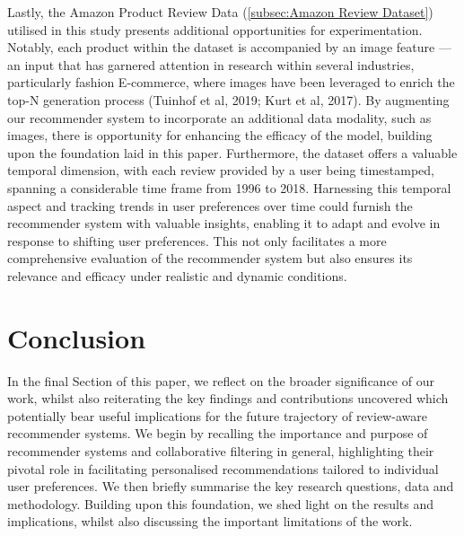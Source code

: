 Lastly, the Amazon Product Review Data (\ref{subsec:Amazon Review Dataset}) utilised in this study presents additional opportunities for experimentation. Notably, each product within the dataset is accompanied by an image feature — an input that has garnered attention in research within several industries, particularly fashion E-commerce, where images have been leveraged to enrich the top-N generation process (Tuinhof et al, 2019; Kurt et al, 2017). By augmenting our recommender system to incorporate an additional data modality, such as images, there is opportunity for enhancing the efficacy of the model, building upon the foundation laid in this paper. Furthermore, the dataset offers a valuable temporal dimension, with each review provided by a user being timestamped, spanning a considerable time frame from 1996 to 2018. Harnessing this temporal aspect and tracking trends in user preferences over time could furnish the recommender system with valuable insights, enabling it to adapt and evolve in response to shifting user preferences. This not only facilitates a more comprehensive evaluation of the recommender system but also ensures its relevance and efficacy under realistic and dynamic conditions. 

\section{Conclusion}
\label{sec:Conclusion for Conclusion}

In the final Section of this paper, we reflect on the broader significance of our work, whilst also reiterating the key findings and contributions uncovered which potentially bear useful implications for the future trajectory of review-aware recommender systems. We begin by recalling the importance and purpose of recommender systems and collaborative filtering in general, highlighting their pivotal role in facilitating personalised recommendations tailored to individual user preferences. We then briefly summarise the key research questions, data and methodology. Building upon this foundation, we shed light on the results and implications, whilst also discussing the important limitations of the work.

